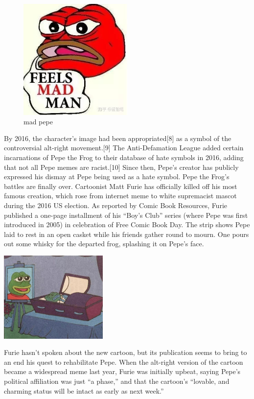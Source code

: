 \begin{figure}[h]
\begin{center}
\includegraphics[width=0.5\textwidth]{frog/image/mad.jpg} %
\caption{mad pepe}
\label{figurezzzz}
\end{center}
\end{figure}
By 2016, the character's image had been appropriated[8] as a symbol of the controversial alt-right movement.[9] The Anti-Defamation League added certain incarnations of Pepe the Frog to their database of hate symbols in 2016, adding that not all Pepe memes are racist.[10] Since then, Pepe's creator has publicly expressed his dismay at Pepe being used as a hate symbol.
Pepe the Frog’s battles are finally over. Cartoonist Matt Furie has officially killed off his most famous creation, which rose from internet meme to white supremacist mascot during the 2016 US election. As reported by Comic Book Resources, Furie published a one-page installment of his “Boy’s Club” series (where Pepe was first introduced in 2005) in celebration of Free Comic Book Day. The strip shows Pepe laid to rest in an open casket while his friends gather round to mourn. One pours out some whisky for the departed frog, splashing it on Pepe’s face. 
\begin{center}
\includegraphics[width=0.4\textwidth]{frog/image/frog2.jpg}
\end{center}
Furie hasn’t spoken about the new cartoon, but its publication seems to bring to an end his quest to rehabilitate Pepe. When the alt-right version of the cartoon became a widespread meme last year, Furie was initially upbeat, saying Pepe’s political affiliation was just “a phase,” and that the cartoon’s “lovable, and charming status will be intact as early as next week.” 

